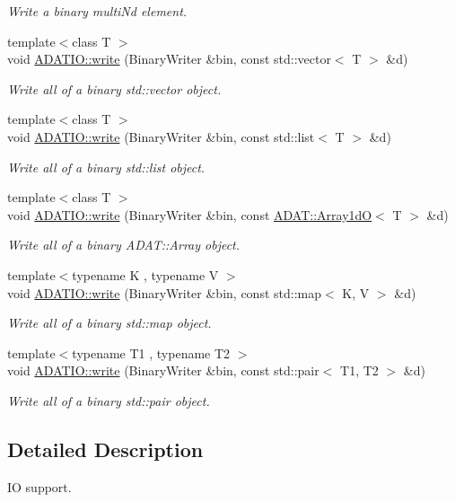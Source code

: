 \begin{DoxyCompactItemize}
\begin{DoxyCompactList}\small\item\em Write a binary multi\+Nd element. \end{DoxyCompactList}\item 
{\footnotesize template$<$class T $>$ }\\void \mbox{\hyperlink{namespaceADATIO_a588c700d58adcb2b77399ac18ec9226b}{A\+D\+A\+T\+I\+O\+::write}} (Binary\+Writer \&bin, const std\+::vector$<$ T $>$ \&d)
\begin{DoxyCompactList}\small\item\em Write all of a binary std\+::vector object. \end{DoxyCompactList}\item 
{\footnotesize template$<$class T $>$ }\\void \mbox{\hyperlink{namespaceADATIO_a940fb003df0f6107d020341f78592201}{A\+D\+A\+T\+I\+O\+::write}} (Binary\+Writer \&bin, const std\+::list$<$ T $>$ \&d)
\begin{DoxyCompactList}\small\item\em Write all of a binary std\+::list object. \end{DoxyCompactList}\item 
{\footnotesize template$<$class T $>$ }\\void \mbox{\hyperlink{namespaceADATIO_aea9e3ff6a488ce22e363d16085c76a85}{A\+D\+A\+T\+I\+O\+::write}} (Binary\+Writer \&bin, const \mbox{\hyperlink{classADAT_1_1Array1dO}{A\+D\+A\+T\+::\+Array1dO}}$<$ T $>$ \&d)
\begin{DoxyCompactList}\small\item\em Write all of a binary A\+D\+A\+T\+::\+Array object. \end{DoxyCompactList}\item 
{\footnotesize template$<$typename K , typename V $>$ }\\void \mbox{\hyperlink{namespaceADATIO_acc2655a91a7a0608906b55f7533bde55}{A\+D\+A\+T\+I\+O\+::write}} (Binary\+Writer \&bin, const std\+::map$<$ K, V $>$ \&d)
\begin{DoxyCompactList}\small\item\em Write all of a binary std\+::map object. \end{DoxyCompactList}\item 
{\footnotesize template$<$typename T1 , typename T2 $>$ }\\void \mbox{\hyperlink{namespaceADATIO_a29572ec079e7257de618b505e0baee59}{A\+D\+A\+T\+I\+O\+::write}} (Binary\+Writer \&bin, const std\+::pair$<$ T1, T2 $>$ \&d)
\begin{DoxyCompactList}\small\item\em Write all of a binary std\+::pair object. \end{DoxyCompactList}\end{DoxyCompactItemize}


\subsection{Detailed Description}
IO support. 

